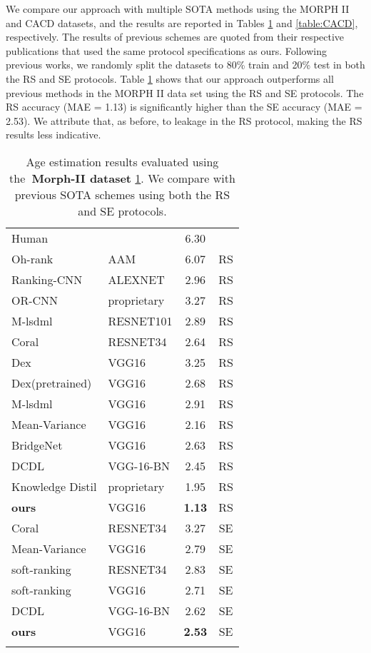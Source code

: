 \documentclass[10pt,journal]{IEEEtran}\usepackage{amsfonts}
\begin{document}
We compare our approach with multiple SOTA methods using the MORPH II
\cite{1613043} and CACD \cite{chen14cross} datasets, and the results are
reported in Tables \ref{table:Morph-II} and \ref{table:CACD}, respectively.
The results of previous schemes are quoted from their respective publications
that used the same protocol specifications as ours. Following previous works,
we randomly split the datasets to 80\% train and 20\% test in both the RS and
SE protocols. Table \ref{table:Morph-II} shows that our approach outperforms
all previous methods in the MORPH II data set using the RS and SE protocols.
The RS accuracy (MAE = 1.13) is significantly higher than the SE accuracy (MAE
= 2.53). We attribute that, as before, to leakage in the RS protocol, making
the RS results less indicative. \begin{table}[tbh]
\caption{Age estimation results evaluated using the\textbf{\ Morph-II dataset}
\ref{table:Morph-II}. We compare with previous SOTA schemes using both the RS
and SE protocols.}\label{table:Morph-II}
\centering
\renewcommand{\arraystretch}{1.3}
\begin{tabular}
[c]{@{}llcc}\toprule  &  &  &
\\
\midrule Human \cite{6920084} &  & 6.30 & \\
Oh-rank\cite{chang2011ordinal} & AAM & 6.07 & RS\\
Ranking-CNN\cite{8099569} & ALEXNET & 2.96 & RS\\
OR-CNN\cite{7780901} & proprietary & 3.27 & RS\\
M-lsdml\cite{8017500} & RESNET101 & 2.89 & RS\\
Coral\cite{coral} & RESNET34 & 2.64 & RS\\
Dex\cite{7406390} & VGG16 & 3.25 & RS\\
Dex(pretrained)\cite{7406390} & VGG16 & 2.68 & RS\\
M-lsdml\cite{8017500} & VGG16 & 2.91 & RS\\
Mean-Variance\cite{Mean-Variance} & VGG16 & 2.16 & RS\\
BridgeNet\cite{8954134} & VGG16 & 2.63 & RS\\
DCDL\cite{9541205} & VGG-16-BN & 2.45 & RS\\
Knowledge Distil\cite{Dark_Knowledge} & proprietary & 1.95 & RS\\
\textbf{ours} & VGG16 & \textbf{1.13} & RS\\
\midrule Coral\cite{coral} & RESNET34 & 3.27 & SE\\
Mean-Variance\cite{Mean-Variance} & VGG16 & 2.79 & SE\\
soft-ranking\cite{9145576} & RESNET34 & 2.83 & SE\\
soft-ranking\cite{9145576} & VGG16 & 2.71 & SE\\
DCDL\cite{9541205} & VGG-16-BN & 2.62 & SE\\
\textbf{ours} & VGG16 & \textbf{2.53} & SE\\
\bottomrule &  &  &
\end{tabular}
\end{table}
\end{document}
